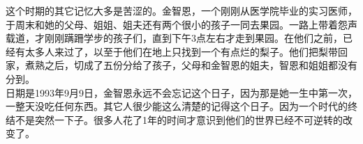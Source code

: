 这个时期的其它记忆大多是苦涩的。金智恩，一个刚刚从医学院毕业的实习医师，于周末和她的父母、姐姐、姐夫还有两个很小的孩子一同去果园。一路上带着怨声载道，才刚刚蹒跚学步的孩子们，直到下午3点左右才走到果园。在他们之前，已经有太多人来过了，以至于他们在地上只找到一个有点烂的梨子。他们把梨带回家，煮熟之后，切成了五份分给了孩子，父母和金智恩的姐夫，智恩和姐姐都没有分到。\\

日期是1993年9月9日，金智恩永远不会忘记这个日子，因为那是她一生中第一次，一整天没吃任何东西。其它人很少能这么清楚的记得这个日子。因为一个时代的终结不是突然一下子。很多人花了1年的时间才意识到他们的世界已经不可逆转的改变了。\\
